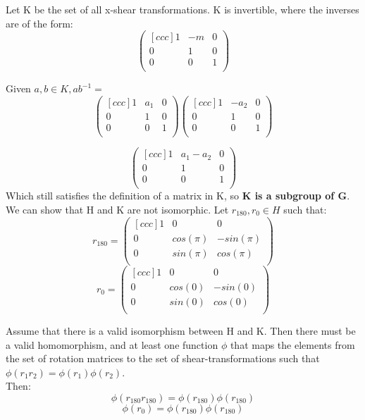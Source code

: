 \begin{enumerate}
\begin{enumerate}
      Let K be the set of all x-shear transformations. K is invertible, where the inverses are of the form:
      $$
      \begin{pmatrix}[ccc]
        1 & -m & 0 \\
        0 &  1 & 0 \\
        0 &  0 & 1 \\
      \end{pmatrix}
      $$

      Given $a,b \in K, ab^{-1} =$
      $$
      \begin{pmatrix}[ccc]
        1 & a_1 & 0 \\
        0 &  1 & 0 \\
        0 &  0 & 1 \\
      \end{pmatrix}
      \begin{pmatrix}[ccc]
        1 & -a_2 & 0 \\
        0 &  1 & 0 \\
        0 &  0 & 1 \\
      \end{pmatrix}
      $$

      $$
      \begin{pmatrix}[ccc]
        1 & a_1-a_2 & 0 \\
        0 &  1 & 0 \\
        0 &  0 & 1 \\
      \end{pmatrix}
      $$
      Which still satisfies the definition of a matrix in K, so \textbf{K is a subgroup of G}.\\

      We can show that H and K are not isomorphic. Let $r_{180}, r_0 \in H$ such that:
      $$
      r_{180} =
      \begin{pmatrix}[ccc]
        1 & 0 & 0 \\
        0 & cos(\pi) & -sin(\pi) \\
        0 & sin(\pi) & cos(\pi) \\
      \end{pmatrix}
      $$
      $$
      r_0 =
      \begin{pmatrix}[ccc]
        1 & 0 & 0 \\
        0 & cos(0) & -sin(0) \\
        0 & sin(0) & cos(0) \\
      \end{pmatrix}      
      $$

      Assume that there is a valid isomorphism between H and K. Then there must be a valid homomorphism, and at least one function $\phi$ that maps the elements from the set of rotation matrices to the set of shear-transformations such that $\phi(r_1r_2) = \phi(r_1)\phi(r_2)$.\\
      Then:
      $$\phi(r_{180}r_{180}) = \phi(r_{180})\phi(r_{180})$$
      $$\phi(r_0) = \phi(r_{180})\phi(r_{180})$$


\end{enumerate}
\end{enumerate}
